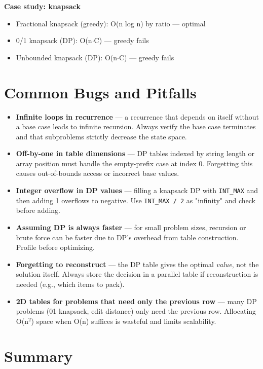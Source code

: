 \textbf{Case study: knapsack}
\begin{itemize}
\item Fractional knapsack (greedy): O(n log n) by ratio — optimal
\item 0/1 knapsack (DP): O(n$\cdot$C) — greedy fails
\item Unbounded knapsack (DP): O(n$\cdot$C) — greedy fails
\end{itemize}
\section{Common Bugs and Pitfalls}

\begin{itemize}
\item \textbf{Infinite loops in recurrence} — a recurrence that depends on itself without a base case leads to infinite recursion. Always verify the base case terminates and that subproblems strictly decrease the state space.
\item \textbf{Off-by-one in table dimensions} — DP tables indexed by string length or array position must handle the empty-prefix case at index 0. Forgetting this causes out-of-bounds access or incorrect base values.
\item \textbf{Integer overflow in DP values} — filling a knapsack DP with \texttt{INT\_MAX} and then adding 1 overflows to negative. Use \texttt{INT\_MAX / 2} as "infinity" and check before adding.
\item \textbf{Assuming DP is always faster} — for small problem sizes, recursion or brute force can be faster due to DP's overhead from table construction. Profile before optimizing.
\item \textbf{Forgetting to reconstruct} — the DP table gives the optimal \textit{value}, not the solution itself. Always store the decision in a parallel table if reconstruction is needed (e.g., which items to pack).
\item \textbf{2D tables for problems that need only the previous row} — many DP problems (01 knapsack, edit distance) only need the previous row. Allocating O(n$^{2}$) space when O(n) suffices is wasteful and limits scalability.
\end{itemize}

\section{Summary}

